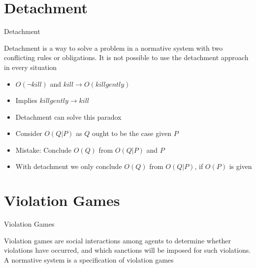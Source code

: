 \documentclass[10pt]{beamer}
\begin{document}
\section[Detachment]{Detachment}
\begin{frame}[fragile]{Detachment}
\begin{definition}
Detachment is a way to solve a problem in a normative system
with two conflicting rules or obligations. It is not possible to
use the detachment approach in every situation
\end{definition}
\begin{itemize}
    \item $O(\lnot kill)$ and $kill \to O(killgently)$
    \item Implies $killgently \to kill$
    \item Detachment can solve this paradox
    \item Consider $O(Q|P)$ as $Q$ ought to be the case given $P$
    \item Mistake: Conclude $O(Q)$ from $O(Q|P)$ and $P$
    \item With detachment we only conclude $O(Q)$ from $O(Q|P)$, if  $O(P)$ is given
\end{itemize}
\end{frame}

\section[Violation Games]{Violation Games}
\begin{frame}[fragile]{Violation Games}
\begin{definition}
Violation games are social interactions among
agents to determine whether violations have occurred, and
which sanctions will be imposed for such violations. A
normative system is a specification of violation games
\end{definition}

\end{frame}
\end{document}
